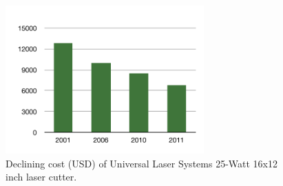%

\begin{figure}[t] %
   \centering
   \includegraphics[width=3in]{img/prices.pdf} 
   \caption[Declining Laser Cutter Prices]{Declining cost (USD) of
     Universal Laser Systems 25-Watt 16x12 inch laser cutter.}
   \label{fig:prices}
\end{figure}
